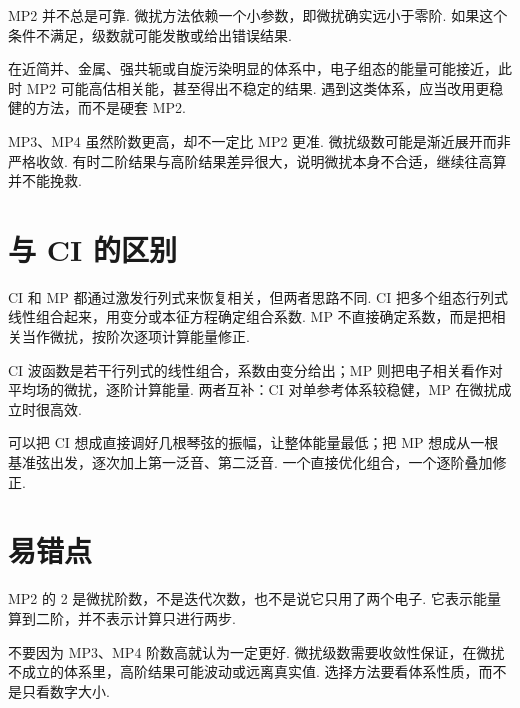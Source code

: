 \documentclass[UTF8,11pt,a4paper,openany]{ctexbook}
\begin{document}
MP2 并不总是可靠. 微扰方法依赖一个小参数，即微扰确实远小于零阶. 如果这个条件不满足，级数就可能发散或给出错误结果. 

\begin{limitbox}
在近简并、金属、强共轭或自旋污染明显的体系中，电子组态的能量可能接近，此时 MP2 可能高估相关能，甚至得出不稳定的结果. 遇到这类体系，应当改用更稳健的方法，而不是硬套 MP2. 
\end{limitbox}

\begin{limitbox}
MP3、MP4 虽然阶数更高，却不一定比 MP2 更准. 微扰级数可能是渐近展开而非严格收敛. 有时二阶结果与高阶结果差异很大，说明微扰本身不合适，继续往高算并不能挽救. 
\end{limitbox}

\section{与 CI 的区别}

CI 和 MP 都通过激发行列式来恢复相关，但两者思路不同. CI 把多个组态行列式线性组合起来，用变分或本征方程确定组合系数. MP 不直接确定系数，而是把相关当作微扰，按阶次逐项计算能量修正. 

\begin{notationbox}
CI 波函数是若干行列式的线性组合，系数由变分给出；MP 则把电子相关看作对平均场的微扰，逐阶计算能量. 两者互补：CI 对单参考体系较稳健，MP 在微扰成立时很高效. 
\end{notationbox}

\begin{analogybox}
可以把 CI 想成直接调好几根琴弦的振幅，让整体能量最低；把 MP 想成从一根基准弦出发，逐次加上第一泛音、第二泛音. 一个直接优化组合，一个逐阶叠加修正. 
\end{analogybox}

\section{易错点}

\begin{limitbox}
MP2 的 2 是微扰阶数，不是迭代次数，也不是说它只用了两个电子. 它表示能量算到二阶，并不表示计算只进行两步. 
\end{limitbox}

\begin{limitbox}
不要因为 MP3、MP4 阶数高就认为一定更好. 微扰级数需要收敛性保证，在微扰不成立的体系里，高阶结果可能波动或远离真实值. 选择方法要看体系性质，而不是只看数字大小. 
\end{limitbox}
\end{document}
